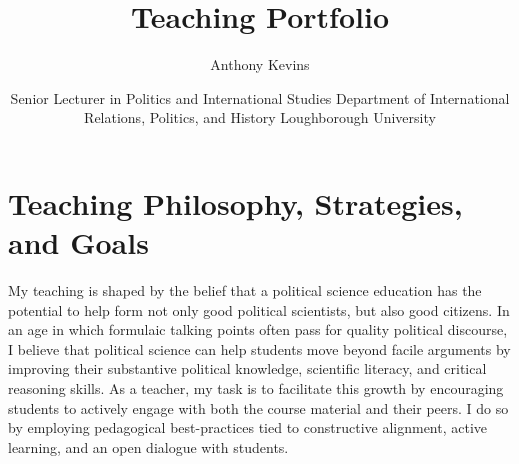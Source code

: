 \documentclass[11pt]{article}
\begin{document}
\begin{spacing}{0}
	\title{\huge \textbf{Teaching Portfolio}}
	\author{\LARGE Anthony Kevins}
	\date{Senior Lecturer in Politics and International Studies \endgraf
	Department of International Relations, Politics, and History \endgraf 
	Loughborough University}
	
	\maketitle
	
\end{spacing}

\tableofcontents

\bigskip
\setlength\fboxsep{0.25cm}
\noindent{}


\newpage

\section{ Teaching Philosophy, Strategies, and Goals}

My teaching is shaped by the belief that a political science education has the potential to help form not only good political scientists, but also good citizens. In an age in which formulaic talking points often pass for quality political discourse, I believe that political science can help students move beyond facile arguments by improving their substantive political knowledge, scientific literacy, and critical reasoning skills. As a teacher, my task is to facilitate this growth by encouraging students to actively engage with both the course material and their peers. I do so by employing pedagogical best-practices tied to constructive alignment, active learning, and an open dialogue with students.
\end{document}
